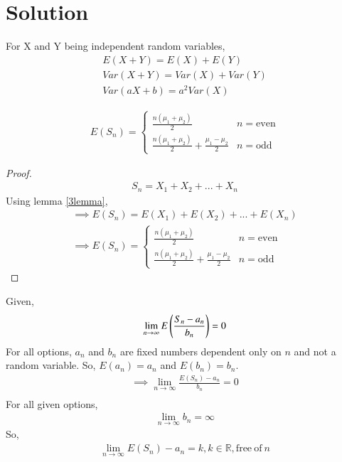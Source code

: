 \documentclass[journal,12pt,twocolumn]{IEEEtran}
\begin{document}
\section{Solution}
\begin{lemma}
\label{3lemma}
For X and Y being independent random variables,
\begin{align}
    E(X+Y)=E(X)+E(Y)\label{1}\\
    Var(X+Y)=Var(X)+Var(Y)\label{3}\\
    Var(aX+b)=a^2Var(X)\label{2}
    \end{align}
    \end{lemma}
\begin{corollary}
\label{eq2.0.4}
\begin{align}
E(S_n)=
    \begin{cases}
    \frac{n(\mu_1+\mu_2)}{2} & n=\mathrm{even}\\
    \frac{n(\mu_1+\mu_2)}{2}+\frac{\mu_1-\mu_2}{2} & n=\mathrm{odd}
    \end{cases}
\end{align}
\end{corollary}
\begin{proof}
\begin{align}
    S_n=X_1+X_2+...+X_n
\end{align}
Using lemma \eqref{3lemma},
\begin{align}
    \implies E(S_n)=E(X_1)+E(X_2)+...+E(X_n)\\
    \implies E(S_n)=
    \begin{cases}
    \frac{n(\mu_1+\mu_2)}{2} & n=\mathrm{even}\\
    \frac{n(\mu_1+\mu_2)}{2}+\frac{\mu_1-\mu_2}{2} & n=\mathrm{odd}
    \end{cases}
\end{align}
\end{proof}
Given,
\begin{align}
    \lim_{n \to\infty}E\left(\frac{S_n-a_n}{b_n}\right)=0
\end{align}
For all options, $a_n$ and $b_n$ are fixed numbers dependent only on $n$ and not a random variable. So, $E(a_n)=a_n$ and $E(b_n)=b_n$.
\begin{align}
    \implies \lim_{n \to\infty}\frac{E(S_n)-a_n}{b_n}=0\\
\end{align}
For all given options, 
\begin{align}
\lim_{n \to\infty}b_n=\infty 
\end{align}
So,
\begin{align}
\lim_{n \to\infty}E(S_n)-a_n=k, k\in\mathbb{R}, \mathrm{free\:of\:}n
\end{align}
\end{document}
